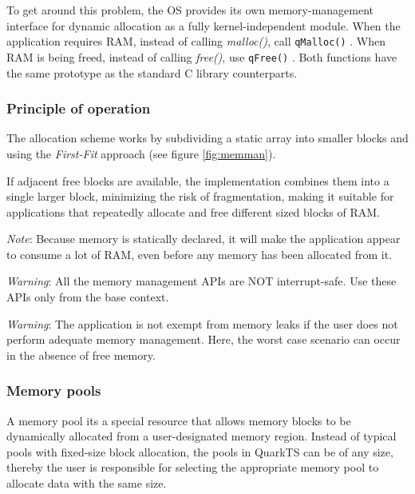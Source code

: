 To get around this problem, the OS provides its own memory-management interface for dynamic allocation as a fully kernel-independent module. When the application requires RAM, instead of calling \textit{malloc()},  call \lstinline{qMalloc()} . When RAM is being freed, instead of calling \textit{free()}, use \lstinline{qFree()} . Both functions have the same prototype as the standard C library counterparts.

\subsubsection{Principle of operation}
The allocation scheme works by subdividing a static array into smaller blocks and using the \textit{First-Fit} approach (see figure \ref{fig:memman}). 



If adjacent free blocks are available, the implementation combines them into a single larger block, minimizing the risk of fragmentation, making it suitable for applications that repeatedly allocate and free different sized blocks of RAM.

\begin{tcolorbox}
\ArrowBoldDownRight \textit{Note}: Because memory is statically declared, it will make the application appear to consume a lot of RAM, even before any memory has been allocated from it.
\end{tcolorbox}

\begin{tcolorbox}
\AsteriskBold \textit{Warning}: All the memory management APIs are NOT interrupt-safe. Use these APIs only from the base context.
\end{tcolorbox}

\begin{tcolorbox}
\AsteriskBold \textit{Warning}: The application is not exempt from memory leaks if the user does not perform adequate memory management. Here, the worst case scenario can occur in the absence of free memory. 
\end{tcolorbox}

\subsubsection{Memory pools}

A memory pool its a special resource that allows memory blocks to be dynamically allocated from a user-designated memory region. Instead of typical pools with fixed-size block allocation, the pools in QuarkTS can be of any size, thereby the user is responsible for selecting the appropriate memory pool to allocate data with the same size. 

